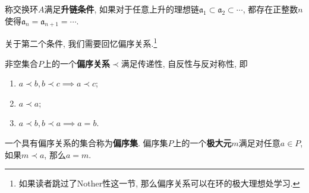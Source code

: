 \begin{defn}
    称交换环$A$满足\textbf{升链条件}, 如果对于任意上升的理想链$\mathfrak{a}_1\subset\mathfrak{a}_2\subset\cdots$, 都存在正整数$n$使得$\mathfrak{a}_n=\mathfrak{a}_{n+1}=\cdots$.
\end{defn}

关于第二个条件, 我们需要回忆偏序关系.\footnote{如果读者跳过了Nother性这一节, 那么偏序关系可以在环的极大理想处学习.}
\begin{defn}
    非空集合$P$上的一个\textbf{偏序关系}$\prec$满足传递性, 自反性与反对称性, 即
    \begin{enumerate}[(1)]
        \item $a\prec b,b\prec c\implies a\prec c$;
        \item $a\prec a$;
        \item $a\prec b,b\prec a\implies a=b$.
    \end{enumerate}
    一个具有偏序关系的集合称为\textbf{偏序集}.
    偏序集$P$上的一个\textbf{极大元}$m$满足对任意$a\in P$, 如果$m\prec a$, 那么$a=m$.
\end{defn}

